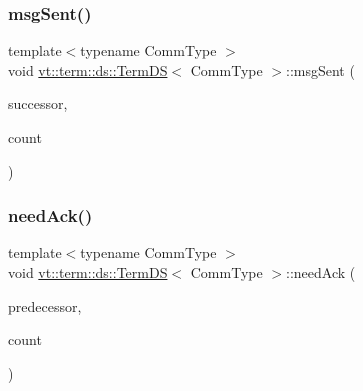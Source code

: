 \mbox{\label{structvt_1_1term_1_1ds_1_1_term_d_s_af03262950f250a7ebceb7079d3113a58}} 
\subsubsection{\texorpdfstring{msg\+Sent()}{msgSent()}}
{\footnotesize\ttfamily template$<$typename Comm\+Type $>$ \\
void \hyperlink{structvt_1_1term_1_1ds_1_1_term_d_s}{vt\+::term\+::ds\+::\+Term\+DS}$<$ Comm\+Type $>$\+::msg\+Sent (\begin{DoxyParamCaption}\item[{\hyperlink{namespacevt_a866da9d0efc19c0a1ce79e9e492f47e2}{Node\+Type}}]{successor,  }\item[{\hyperlink{structvt_1_1term_1_1ds_1_1_term_d_s_a54f4ebd7e1ecb59c32c0f5b03ef9f20b}{Count\+Type}}]{count }\end{DoxyParamCaption})}

\mbox{\label{structvt_1_1term_1_1ds_1_1_term_d_s_ae1f49e96bb1903570e1639685b816388}} 
\subsubsection{\texorpdfstring{need\+Ack()}{needAck()}}
{\footnotesize\ttfamily template$<$typename Comm\+Type $>$ \\
void \hyperlink{structvt_1_1term_1_1ds_1_1_term_d_s}{vt\+::term\+::ds\+::\+Term\+DS}$<$ Comm\+Type $>$\+::need\+Ack (\begin{DoxyParamCaption}\item[{\hyperlink{namespacevt_a866da9d0efc19c0a1ce79e9e492f47e2}{Node\+Type} const}]{predecessor,  }\item[{\hyperlink{structvt_1_1term_1_1ds_1_1_term_d_s_a54f4ebd7e1ecb59c32c0f5b03ef9f20b}{Count\+Type} const}]{count }\end{DoxyParamCaption})}

\mbox{\label{structvt_1_1term_1_1ds_1_1_term_d_s_a684dd240eeab7ef4c2d1477840276f28}} 
